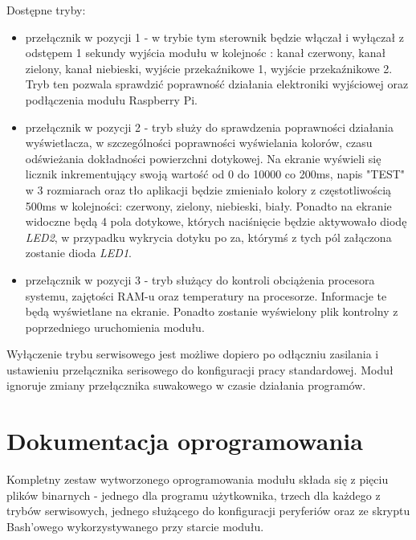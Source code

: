 \documentclass[12pt, eng, twoside, openany, final]{mgr}
\begin{document}
            Dostępne tryby:
            \begin{itemize}
                \item przełącznik w pozycji 1 - w trybie tym sterownik będzie włączał i wyłączał z odstępem 1 sekundy wyjścia modułu w kolejnośc : kanał czerwony, kanał zielony, kanał niebieski, wyjście przekaźnikowe 1, wyjście przekaźnikowe 2. Tryb ten pozwala sprawdzić poprawność działania elektroniki wyjściowej oraz podłączenia modułu Raspberry Pi.
                
                \item przełącznik w pozycji 2 - tryb służy do sprawdzenia poprawności działania wyświetlacza, w szczególności poprawności wyświelania kolorów, czasu odświeżania dokładności powierzchni dotykowej.
                Na ekranie wyświeli się licznik inkrementujący swoją wartość od 0 do 10000 co 200ms, napis "TEST" w 3 rozmiarach oraz tło aplikacji będzie zmieniało kolory z częstotliwością 500ms w kolejności: czerwony, zielony, niebieski, biały. Ponadto na ekranie widoczne będą 4 pola dotykowe, których naciśnięcie będzie aktywowało diodę \emph{LED2}, w przypadku wykrycia dotyku po za, którymś z tych pól załączona zostanie dioda \emph{LED1}. 
                
                \item przełącznik w pozycji 3 - tryb służący do kontroli obciążenia procesora systemu, zajętości RAM-u oraz temperatury na procesorze. Informacje te będą wyświetlane na ekranie. Ponadto zostanie wyświelony plik kontrolny z poprzedniego uruchomienia modułu.
            \end{itemize}
            
            Wyłączenie trybu serwisowego jest możliwe dopiero po odłączniu zasilania i ustawieniu przełącznika serisowego do konfiguracji pracy standardowej.
            Moduł ignoruje zmiany przełącznika suwakowego w czasie działania programów.
            
            \newpage
            
            \section{Dokumentacja oprogramowania}
            Kompletny zestaw wytworzonego oprogramowania modułu składa się z pięciu plików binarnych - jednego dla programu użytkownika, trzech dla każdego z trybów serwisowych, jednego służącego do konfiguracji peryferiów oraz ze skryptu Bash'owego wykorzystywanego przy starcie modułu.
            
\end{document}
